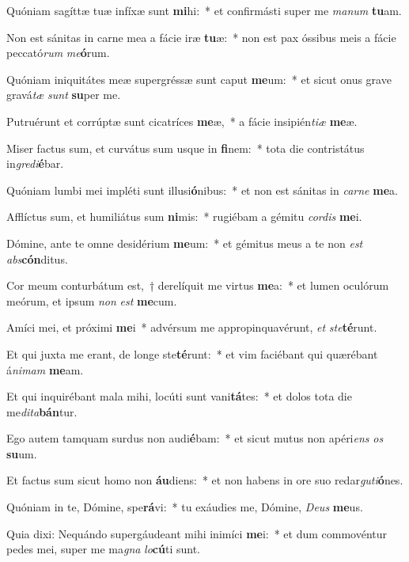 \item Quóniam sagíttæ tuæ infíxæ sunt \textbf{mi}hi:~* et confirmásti super me \textit{manum} \textbf{tu}am.
\item Non est sánitas in carne mea a fácie iræ \textbf{tu}æ:~* non est pax óssibus meis a fácie peccató\textit{rum} \textit{me}\textbf{ó}rum.
\item Quóniam iniquitátes meæ supergréssæ sunt caput \textbf{me}um:~* et sicut onus grave gravá\textit{tæ} \textit{sunt} \textbf{su}per me.
\item Putruérunt et corrúptæ sunt cicatríces \textbf{me}æ,~* a fácie insipién\textit{tiæ} \textbf{me}æ.
\item Miser factus sum, et curvátus sum usque in \textbf{fi}nem:~* tota die contristátus in\textit{gredi}\textbf{é}bar.
\item Quóniam lumbi mei impléti sunt illusi\textbf{ó}nibus:~* et non est sánitas in \textit{carne} \textbf{me}a.
\item Afflíctus sum, et humiliátus sum \textbf{ni}mis:~* rugiébam a gémitu \textit{cordis} \textbf{me}i.
\item Dómine, ante te omne desidérium \textbf{me}um:~* et gémitus meus a te non \textit{est} \textit{abs}\textbf{cón}ditus.
\item Cor meum conturbátum est,~† derelíquit me virtus \textbf{me}a:~* et lumen oculórum meórum, et ipsum \textit{non} \textit{est} \textbf{me}cum.
\item Amíci mei, et próximi \textbf{me}i~* advérsum me appropinquavérunt, \textit{et} \textit{ste}\textbf{té}runt.
\item Et qui juxta me erant, de longe ste\textbf{té}runt:~* et vim faciébant qui quærébant á\textit{nimam} \textbf{me}am.
\item Et qui inquirébant mala mihi, locúti sunt vani\textbf{tá}tes:~* et dolos tota die me\tinyhspace\textit{dita}\textbf{bán}tur.
\item Ego autem tamquam surdus non audi\textbf{é}bam:~* et sicut mutus non apéri\textit{ens} \textit{os} \textbf{su}um.
\item Et factus sum sicut homo non \textbf{áu}diens:~* et non habens in ore suo redar\textit{guti}\textbf{ó}nes.
\item Quóniam in te, Dómine, spe\textbf{rá}vi:~* tu exáudies me, Dómine, \textit{Deus} \textbf{me}us.
\item Quia dixi: Nequándo supergáudeant mihi inimíci \textbf{me}i:~* et dum commovéntur pedes mei, super me ma\textit{gna} \textit{lo}\textbf{cú}ti sunt.
